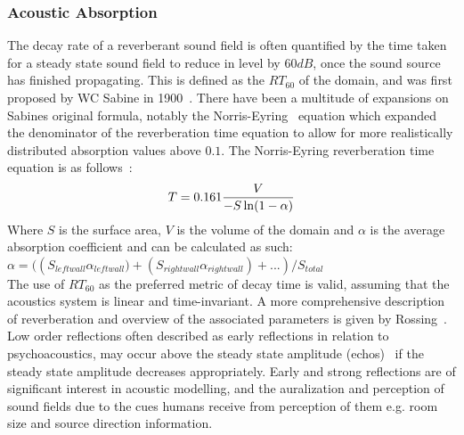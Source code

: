 \subsubsection{Acoustic Absorption}
The decay rate of a reverberant sound field is often quantified by the time taken for a steady state sound field to reduce in level by $60{dB}$, once the sound source has finished propagating. This is defined as the $RT_{60}$ of the domain, and was first proposed by WC Sabine in 1900~\cite{Everest2009}. There have been a multitude of expansions on Sabines original formula, notably the Norris-Eyring~\cite{Beranek2006} equation which expanded the denominator of the reverberation time equation to allow for more realistically distributed absorption values above $0.1$. The Norris-Eyring reverberation time equation is as follows~\cite{Davis2014}:\\
\begin{equation}
T = 0.161\frac{V}{-S \ln(1 - \alpha)}\\
\end{equation}
Where $S$ is the surface area, $V$ is the volume of the domain and $\alpha$ is the average absorption coefficient and can be calculated as such:\\
$\alpha = (\left( S_{leftwall} \alpha_{leftwall})+(S_{rightwall} \alpha_{rightwall})+... \right) /S_{total}$ \\

The use of $RT_{60}$ as the preferred metric of decay time is valid, assuming that the acoustics system is linear and time-invariant.
A more comprehensive description of reverberation and overview of the associated parameters is given by Rossing~\cite{rossing2007springer}. \\

Low order reflections often described as early reflections in relation to psychoacoustics, may occur above the steady state amplitude (echos)~\cite{Everest2009} if the steady state amplitude decreases appropriately. Early and strong reflections are of significant interest in acoustic modelling, and the auralization and perception of sound fields due to the cues humans receive from perception of them e.g. room size and source direction information.\\

